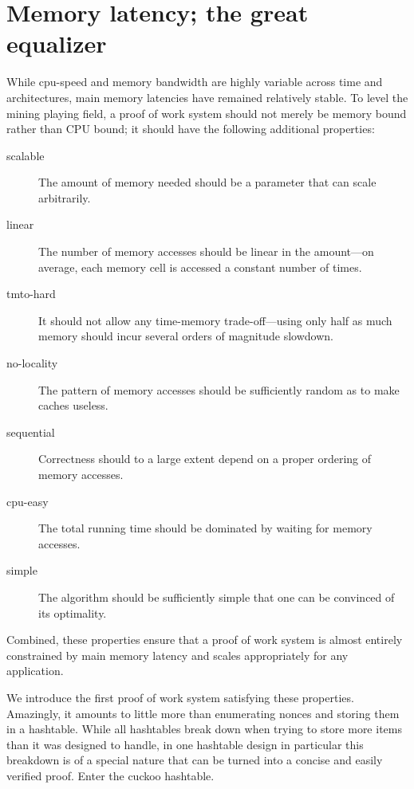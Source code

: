 \documentclass[11pt, oneside]{article}
\begin{document}
\section{Memory latency; the great equalizer}
While cpu-speed and memory bandwidth are highly variable across time and architectures, main memory latencies
have remained relatively stable.
To level the mining playing field, a proof of work system should not merely be memory bound rather
than CPU bound; it should have the following additional properties:
\begin{description}
\item[scalable] The amount of memory needed should be a parameter that can scale arbitrarily.
\item[linear] The number of memory accesses should be linear in the amount---on average,
each memory cell is accessed a constant number of times.
\item[tmto-hard] It should not allow any time-memory trade-off---using only half as much memory should incur several orders of magnitude slowdown.
\item[no-locality] The pattern of memory accesses should be sufficiently random as to make caches useless.
\item[sequential] Correctness should to a large extent depend on a proper ordering of memory accesses.
\item[cpu-easy] The total running time should be dominated by waiting for memory accesses.
\item[simple] The algorithm should be sufficiently simple that one can be convinced of its optimality.
\end{description}
Combined, these properties ensure that a proof of work system is almost entirely constrained by main
memory latency and scales appropriately for any application.

We introduce the first proof of work system satisfying these properties.
Amazingly, it amounts to little more than enumerating nonces and storing them
in a hashtable. While all hashtables break down when trying to store more items than
it was designed to handle, in one hashtable design in particular this breakdown
is of a special nature that can be turned into a concise and easily verified proof.
Enter the cuckoo hashtable.
\end{document}
